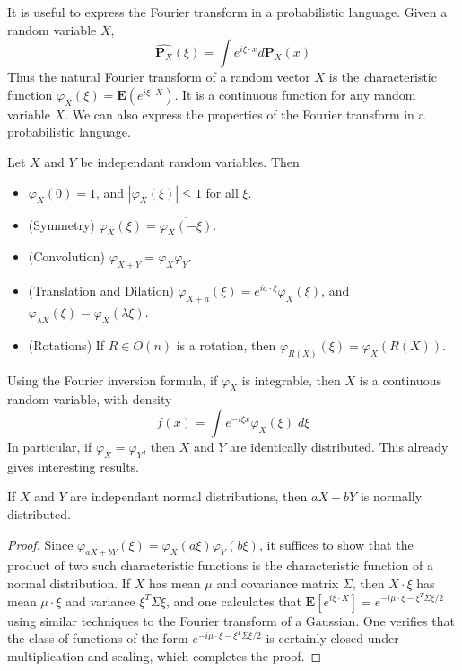 It is useful to express the Fourier transform in a probabilistic language. Given a random variable $X$,
%
\[ \widehat{\mathbf{P}_X}(\xi) = \int e^{i \xi \cdot x} d\mathbf{P}_X(x) \]
%
Thus the natural Fourier transform of a random vector $X$ is the {\emph characteristic function} $\varphi_X(\xi) = \mathbf{E}(e^{i \xi \cdot X})$. It is a continuous function for any random variable $X$. We can also express the properties of the Fourier transform in a probabilistic language.

\begin{lemma}
    Let $X$ and $Y$ be independant random variables. Then
    \begin{itemize}
        \item $\varphi_X(0) = 1$, and $|\varphi_X(\xi)| \leq 1$ for all $\xi$.

        \item (Symmetry) $\varphi_X(\xi) = \overline{\varphi_X(-\xi)}$.

        \item (Convolution) $\varphi_{X+Y} = \varphi_X \varphi_Y$.

        \item (Translation and Dilation) $\varphi_{X+a}(\xi) = e^{i a \cdot \xi} \varphi_X(\xi)$, and $\varphi_{\lambda X}(\xi) = \varphi_X(\lambda \xi)$.

        \item (Rotations) If $R \in O(n)$ is a rotation, then $\varphi_{R(X)}(\xi) = \varphi_X(R(X))$.
    \end{itemize}
\end{lemma}

Using the Fourier inversion formula, if $\varphi_X$ is integrable, then $X$ is a continuous random variable, with density
%
\[ f(x) = \int e^{- i \xi x} \varphi_X(\xi)\; d\xi \]
%
In particular, if $\varphi_X = \varphi_Y$, then $X$ and $Y$ are identically distributed. This already gives interesting results.

\begin{theorem}
    If $X$ and $Y$ are independant normal distributions, then $aX + bY$ is normally distributed.
\end{theorem}
\begin{proof}
    Since $\varphi_{aX+bY}(\xi) = \varphi_X(a \xi) \varphi_Y(b \xi)$, it suffices to show that the product of two such characteristic functions is the characteristic function of a normal distribution. If $X$ has mean $\mu$ and covariance matrix $\Sigma$, then $X \cdot \xi$ has mean $\mu \cdot \xi$ and variance $\xi^T \Sigma \xi$, and one calculates that $\mathbf{E}[e^{i \xi \cdot X}] = e^{- i \mu \cdot \xi - \xi^T \Sigma \xi / 2}$ using similar techniques to the Fourier transform of a Gaussian. One verifies that the class of functions of the form $e^{-i \mu \cdot \xi - \xi^T \Sigma \xi / 2}$ is certainly closed under multiplication and scaling, which completes the proof. 
\end{proof}

